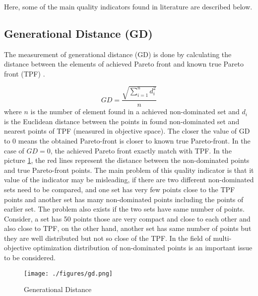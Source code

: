 \documentclass{article}
\begin{document}
Here, some of the main quality indicators found in literature are described below.

\subsection{Generational Distance (GD)}
The measurement of generational distance (GD) is done by calculating the distance between the elements of achieved Pareto front and known true Pareto front (TPF) \cite{veldhuizen_multiobjective_1998}. 

\begin{equation}
	GD=\frac{\sqrt{{\sum\limits_{i=1}^n{d_i^2} }}}{n}
\end{equation}  
where $n$ is the number of element found in a achieved non-dominated set and $d_i$ is the Euclidean distance between the points in found non-dominated set and nearest points of TPF (measured in objective space). 
The closer the value of GD to $0$ means the obtained Pareto-front is closer to known true Pareto-front. 
In the case of $GD=0$, the achieved Pareto front exactly match with TPF. 
In the picture \ref{fig:generational distance}, the red lines represent the distance between the non-dominated points and true Pareto-front points. 
The main problem of this quality indicator is that it value of the indicator may be misleading, if there are two different non-dominated sets need to be compared, and one set has very few points close to the TPF points and another set has many non-dominated points including the points of earlier set.
The problem also exists if the two sets have same number of points. 
Consider, a set has 50 points those are very compact and close to each other and also close to TPF, on the other hand, another set has same number of points but they are well distributed but not so close of the TPF. 
In the field of multi-objective optimization distribution of non-dominated points is an important issue to be considered. 

\begin{figure}


\centering
\texttt{[image: ./figures/gd.png]}
\caption{Generational Distance}
\label{fig:generational distance}
\end{figure}   
\end{document}
